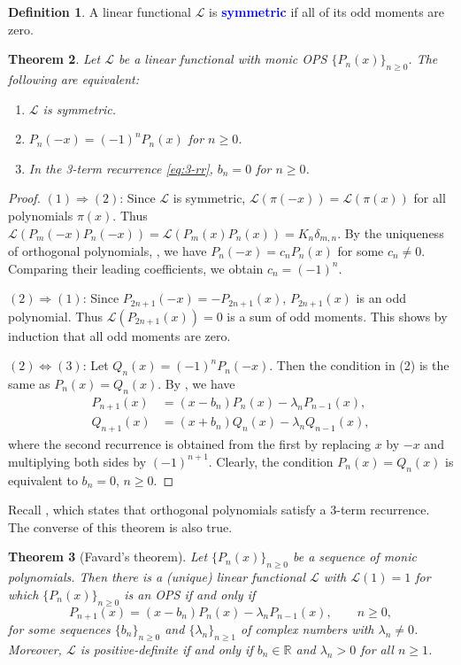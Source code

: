 \documentclass[oneside]{book}
\numberwithin{equation}{section}
\newtheorem{thm}{Theorem}[section]
\theoremstyle{definition}
\newtheorem{defn}[thm]{Definition}
\newcommand{\RR}{\mathbb{R}}
\newcommand\LL{\mathcal{L}}
\renewcommand\emph[1]{\textcolor{blue}{\bf #1}}
\begin{document}
\begin{defn}
  A linear functional \( \LL \) is \emph{symmetric} if all of its odd
  moments are zero.
\end{defn}

\begin{thm}
  Let \( \LL \) be a linear functional with monic OPS
  \( \{ P_n(x) \}_{n\ge 0} \). The following are equivalent:
  \begin{enumerate}
  \item \( \LL \) is symmetric.
  \item \( P_n(-x) = (-1)^n P_n(x) \) for \( n\ge0 \).
  \item In the 3-term recurrence \eqref{eq:3-rr}, \( b_n=0 \) for \( n\ge0 \).
  \end{enumerate}
\end{thm}

\begin{proof}
  \( (1) \Rightarrow (2) \): Since \( \LL \) is symmetric,
  \( \LL(\pi(-x)) = \LL(\pi(x)) \) for all polynomials \( \pi(x) \).
  Thus
  \( \LL(P_m(-x)P_n(-x)) = \LL(P_m(x)P_n(x)) = K_n \delta_{m,n} \).
By the uniqueness of orthogonal polynomials, ,
we have \( P_n(-x) = c_n P_n(x) \) for some \( c_n\ne 0 \).
Comparing their leading coefficients, we obtain \( c_n = (-1)^n \).

\( (2) \Rightarrow (1) \): Since \( P_{2n+1}(-x) = -P_{2n+1}(x) \),
\( P_{2n+1}(x) \) is an odd polynomial. Thus \( \LL(P_{2n+1}(x))=0 \)
is a sum of odd moments. This shows by induction that all odd moments
are zero.

\( (2) \Leftrightarrow (3) \): Let \( Q_n(x) = (-1)^n P_n(-x) \). Then
the condition in (2) is the same as \( P_n(x) = Q_n(x) \). By
, we have
\begin{align*}
    P_{n+1}(x) &= (x-b_n) P_n(x) - \lambda_n P_{n-1}(x),\\
    Q_{n+1}(x) &= (x+b_n) Q_n(x) - \lambda_n Q_{n-1}(x),
\end{align*}
where the second recurrence is obtained from the first by replacing
\( x \) by \( -x \) and multiplying both sides by \( (-1)^{n+1} \).
Clearly, the condition \( P_n(x) = Q_n(x) \)
is equivalent to \( b_n = 0 \), \( n\ge0 \).
\end{proof}


Recall , which states that orthogonal polynomials
satisfy a 3-term recurrence. The converse of this theorem is also
true.

\begin{thm}[Favard's theorem]
  Let \( \{ P_n(x) \}_{n\ge 0} \) be a sequence of monic polynomials.
  Then there is a (unique) linear functional \( \LL \) with
  \( \LL(1) = 1 \) for which \( \{ P_n(x) \}_{n\ge 0} \) is an OPS
  if and only if 
  \begin{equation}\label{eq:9}
    P_{n+1}(x) = (x-b_n) P_n(x) - \lambda_n P_{n-1}(x), \qquad n\ge 0,
  \end{equation}
  for some sequences \( \{b_n\}_{n\ge0} \) and
  \( \{\lambda_n\}_{n\ge1} \) of complex numbers with
  \( \lambda_n\ne0 \). Moreover, \( \LL \) is positive-definite if and
  only if \( b_n\in \RR \) and \( \lambda_n>0 \) for all \( n\ge1 \).
\end{thm}
\end{document}
